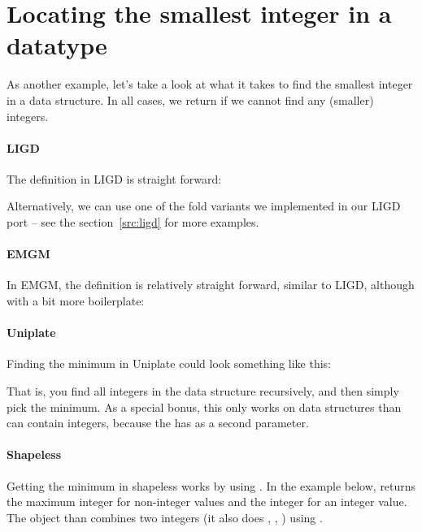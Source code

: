 \section{Locating the smallest integer in a datatype}
As another example, let's take a look at what it takes to find the smallest
integer in a data structure. In all cases, we return  if we cannot
find any (smaller) integers.

\paragraph{LIGD} The definition in LIGD is straight forward:


Alternatively, we can use one of the fold variants we implemented in our LIGD
port -- see the section~\ref{src:ligd} for more examples.

\paragraph{EMGM} In EMGM, the definition is relatively straight forward, similar
to LIGD, although with a bit more boilerplate:



\paragraph{Uniplate}

Finding the minimum in Uniplate could look something like this:



That is, you find all integers in the data structure recursively, and then
simply pick the minimum. As a special bonus, this only works on data structures
than can contain integers, because the  has  as a second
parameter.
\paragraph{Shapeless}
Getting the minimum in shapeless works by using . In the example
below,  returns the maximum integer for non-integer values and the
integer for an integer value. The  object than combines two integers
(it also does , , ) using .

